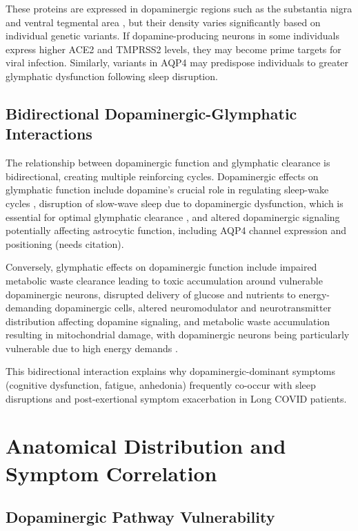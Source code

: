 \documentclass[12pt]{article}
\begin{document}
These proteins are expressed in dopaminergic regions such as the substantia nigra and ventral tegmental area \citep{song2021neuroinvasion, douaud2022brain}, but their density varies significantly based on individual genetic variants. If dopamine-producing neurons in some individuals express higher ACE2 and TMPRSS2 levels, they may become prime targets for viral infection. Similarly, variants in AQP4 may predispose individuals to greater glymphatic dysfunction following sleep disruption.

\subsection*{Bidirectional Dopaminergic-Glymphatic Interactions}

The relationship between dopaminergic function and glymphatic clearance is bidirectional, creating multiple reinforcing cycles. Dopaminergic effects on glymphatic function include dopamine's crucial role in regulating sleep-wake cycles \citep{dzirasa2006}, disruption of slow-wave sleep due to dopaminergic dysfunction, which is essential for optimal glymphatic clearance \citep{Xie2013}, and altered dopaminergic signaling potentially affecting astrocytic function, including AQP4 channel expression and positioning (needs citation).

Conversely, glymphatic effects on dopaminergic function include impaired metabolic waste clearance leading to toxic accumulation around vulnerable dopaminergic neurons, disrupted delivery of glucose and nutrients to energy-demanding dopaminergic cells, altered neuromodulator and neurotransmitter distribution affecting dopamine signaling, and metabolic waste accumulation resulting in mitochondrial damage, with dopaminergic neurons being particularly vulnerable due to high energy demands \citep{stefano2021mitochondria}.

This bidirectional interaction explains why dopaminergic-dominant symptoms (cognitive dysfunction, fatigue, anhedonia) frequently co-occur with sleep disruptions and post-exertional symptom exacerbation in Long COVID patients.

\section{Anatomical Distribution and Symptom Correlation}

\subsection*{Dopaminergic Pathway Vulnerability}
\end{document}
